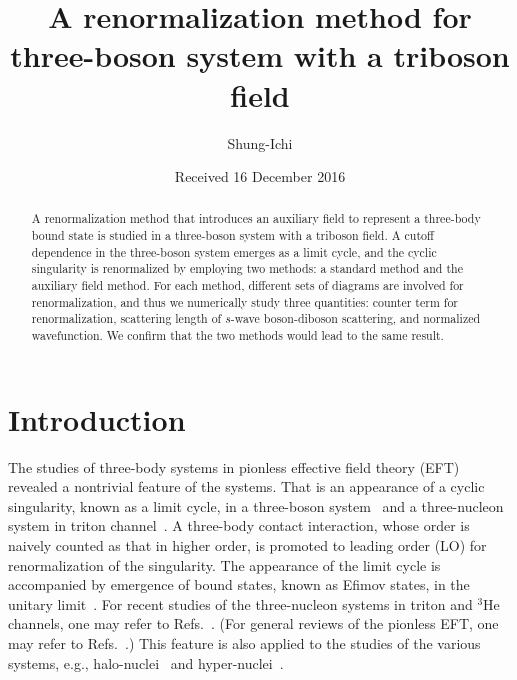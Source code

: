 \documentclass[jkps,preprint,fleqn,showpacs,showkeys]{revtex4}
\begin{document}
\setcounter{page}{0}
\title[]{
A renormalization method
for three-boson system with a triboson field
}
\author{Shung-Ichi }

\date[]{Received 16 December 2016}

\begin{abstract}
A renormalization method that introduces an auxiliary field 
to represent a three-body bound state
is studied in a three-boson system
with a triboson field.
%
A cutoff dependence in the three-boson system emerges
as a limit cycle, and the cyclic singularity is renormalized
by employing two methods: 
a standard method and the auxiliary field method.
% 
For each method, different sets of diagrams
are involved for renormalization,
and thus we numerically study three quantities:
counter term for renormalization,
scattering length of $s$-wave boson-diboson scattering,
and normalized wavefunction.
We confirm that the two methods would lead to the same result.
\end{abstract}



\maketitle

\section{Introduction}

The studies of three-body systems in pionless effective field theory (EFT)
revealed a nontrivial feature of the systems.
That is an appearance of a cyclic singularity, known as a limit cycle,
in a three-boson system~\cite{bhvk-npa99}
and a three-nucleon system in triton channel~\cite{bhvk-npa00}.
%
A three-body contact interaction, whose order is naively counted as 
that in higher order, is promoted to leading order (LO) for renormalization
of the singularity.
%
The appearance of the limit cycle is accompanied by emergence of bound
states, known as Efimov states, in the unitary limit~\cite{efimov}.
%
For recent studies of the three-nucleon systems in triton and $^3$He channels,
one may refer to
Refs.~\cite{ab-jpg10,kh-prc11,vetal-prc14,ketal-jpg16}.
(For general reviews of the pionless EFT, one may refer to
Refs.~\cite{bvk-arnps02,bh-pr06}.)
This feature is also applied to the studies of the various systems,
e.g., halo-nuclei~\cite{h-epjwc16}
and hyper-nuclei~\cite{h-npa02,a-ijmpe16,ayo-prc14,ao-prc14,aro-prc15}.
\end{document}
